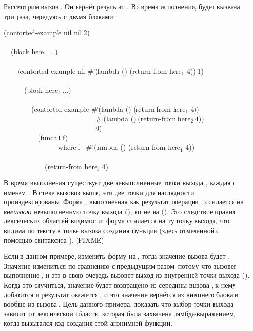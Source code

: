 Рассмотрим вызов . Он вернёт результат
. Во время исполнения,  будет вызвана три раза,
чередуясь с двумя блоками:

\begin{lisp}
(contorted-example nil nil 2) \\
 \\
~~(block here${}_1$ ...) \\
 \\
~~~~(contorted-example nil \#'(lambda () (return-from here${}_1$ 4)) 1) \\
 \\
~~~~~~(block here${}_2$ ...) \\
 \\
~~~~~~~~(contorted-example \#'(lambda () (return-from here${}_1$ 4)) \\
~~~~~~~~~~~~~~~~~~~~~~~~~~~\#'(lambda () (return-from here${}_2$ 4)) \\
~~~~~~~~~~~~~~~~~~~~~~~~~~~0) \\
~~~~~~~~~~(funcall f) \\
~~~~~~~~~~~~~~~~{\rm where} f \EV\ \#'(lambda () (return-from here${}_1$ 4)) \\
 \\
~~~~~~~~~~~~(return-from here${}_1$ 4)
\end{lisp}

В время выполнения  существует две невыполненные точки выхода
, каждая с именем . В стеке вызовов выше, эти две точки
для наглядности проиндексированы.
Форма , выполненная как результат операции ,
ссылается на \emph{внешнюю} невыполненную точку выхода (), но не
на ().
Это следствие правил лексических областей видимости: форма ссылается на ту точку
выхода, что видима по тексту в точке вызова создания функции
(здесь отмеченной с помощью синтаксиса ). (FIXME)

Если в данном примере, изменить форму  на ,
тогда значение вызова  будет . Значение
измениться по сравнению с предыдущим разом, потому что  вызовет
выполнение , и это в свою очередь вызовет выход
из внутренней точки выхода ().
Когда это случиться, значение  будет возвращено из середины вызова
, к нему добавится  и результат окажется , и это
значение вернётся из внешнего блока и вообще из вызова
. Цель данного примера, показать что выбор точки выхода
зависит от лексической области, которая была 
захвачена лямбда-выражением, когда вызывался код создания этой анонимной функции.

